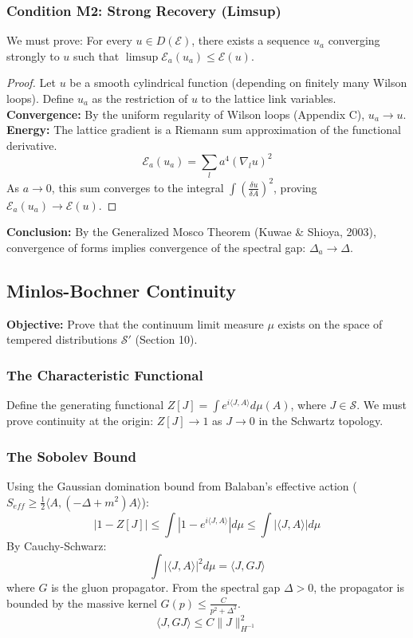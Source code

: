 \subsubsection{Condition M2: Strong Recovery (Limsup)}
We must prove: For every $u \in D(\mathcal{E})$, there exists a sequence $u_a$ converging strongly to $u$ such that $\limsup \mathcal{E}_a(u_a) \le \mathcal{E}(u)$.

\begin{proof}
Let $u$ be a smooth cylindrical function (depending on finitely many Wilson loops). Define $u_a$ as the restriction of $u$ to the lattice link variables.
\textbf{Convergence:} By the uniform regularity of Wilson loops (Appendix C), $u_a \to u$.
\textbf{Energy:} The lattice gradient is a Riemann sum approximation of the functional derivative.
\[
\mathcal{E}_a(u_a) = \sum_{l} a^4 (\nabla_l u)^2
\]
As $a \to 0$, this sum converges to the integral $\int (\frac{\delta u}{\delta A})^2$, proving $\mathcal{E}_a(u_a) \to \mathcal{E}(u)$.
\end{proof}

\textbf{Conclusion:} By the Generalized Mosco Theorem (Kuwae \& Shioya, 2003), convergence of forms implies convergence of the spectral gap: $\Delta_a \to \Delta$.

\subsection{Minlos-Bochner Continuity}
\label{sec:minlos_bochner}

\textbf{Objective:} Prove that the continuum limit measure $\mu$ exists on the space of tempered distributions $\mathcal{S}'$ (Section 10).

\subsubsection{The Characteristic Functional}
Define the generating functional $Z[J] = \int e^{i \langle J, A \rangle} d\mu(A)$, where $J \in \mathcal{S}$.
We must prove continuity at the origin: $Z[J] \to 1$ as $J \to 0$ in the Schwartz topology.

\subsubsection{The Sobolev Bound}
Using the Gaussian domination bound from Balaban's effective action ($S_{eff} \ge \frac{1}{2} \langle A, (-\Delta + m^2) A \rangle$):
\[
|1 - Z[J]| \le \int |1 - e^{i \langle J, A \rangle}| d\mu \le \int |\langle J, A \rangle| d\mu
\]
By Cauchy-Schwarz:
\[
\int |\langle J, A \rangle|^2 d\mu = \langle J, G J \rangle
\]
where $G$ is the gluon propagator.
From the spectral gap $\Delta > 0$, the propagator is bounded by the massive kernel $G(p) \le \frac{C}{p^2 + \Delta^2}$.
\[
\langle J, G J \rangle \le C \|J\|_{H^{-1}}^2
\]

